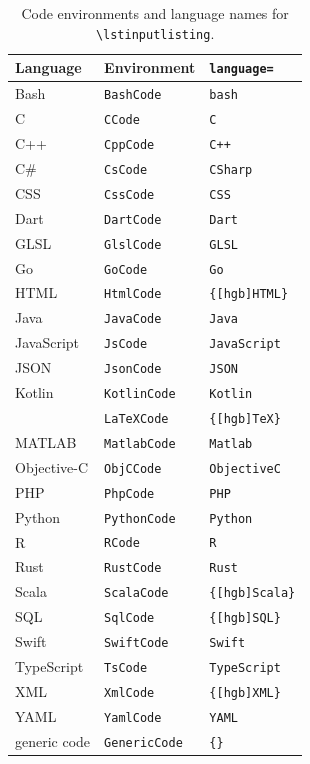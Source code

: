 \documentclass[language=english]{hgbarticle}
\begin{document}
\begin{table}[H]
\caption{Code environments and language names for \texttt{\textbackslash lstinputlisting}.}
\label{tab:CodeEnvironments}
\centering\small
\begin{tabular}{@{}lll@{}}
	\toprule
	Language     & Environment          & \texttt{language=} \\
	\midrule
	Bash         & \texttt{BashCode}    & \texttt{bash} \\
	C            & \texttt{CCode}       & \texttt{C} \\
	C++          & \texttt{CppCode}     & \texttt{C++} \\
	C\#          & \texttt{CsCode}      & \texttt{CSharp} \\
	CSS          & \texttt{CssCode}     & \texttt{CSS} \\
	Dart         & \texttt{DartCode}    & \texttt{Dart} \\
	GLSL         & \texttt{GlslCode}    & \texttt{GLSL} \\
	Go           & \texttt{GoCode}      & \texttt{Go} \\
	HTML         & \texttt{HtmlCode}    & \texttt{\{[hgb]HTML\}} \\
	Java         & \texttt{JavaCode}    & \texttt{Java} \\
	JavaScript   & \texttt{JsCode}      & \texttt{JavaScript} \\
	JSON         & \texttt{JsonCode}    & \texttt{JSON} \\
	Kotlin       & \texttt{KotlinCode}  & \texttt{Kotlin} \\
	\latex       & \texttt{LaTeXCode}   & \texttt{\{[hgb]TeX\}} \\
	MATLAB       & \texttt{MatlabCode}  & \texttt{Matlab} \\
	Objective-C  & \texttt{ObjCCode}    & \texttt{ObjectiveC} \\
	PHP          & \texttt{PhpCode}     & \texttt{PHP} \\
	Python       & \texttt{PythonCode}  & \texttt{Python} \\
	R            & \texttt{RCode}       & \texttt{R} \\
	Rust         & \texttt{RustCode}    & \texttt{Rust} \\
	Scala        & \texttt{ScalaCode}   & \texttt{\{[hgb]Scala\}} \\
	SQL          & \texttt{SqlCode}     & \texttt{\{[hgb]SQL\}} \\
	Swift        & \texttt{SwiftCode}   & \texttt{Swift} \\
	TypeScript   & \texttt{TsCode}      & \texttt{TypeScript} \\
	XML          & \texttt{XmlCode}     & \texttt{\{[hgb]XML\}} \\
	YAML         & \texttt{YamlCode}    & \texttt{YAML} \\
	generic code & \texttt{GenericCode} & \texttt{\{\}} \\
	\bottomrule
\end{tabular}
\end{table}
\end{document}
